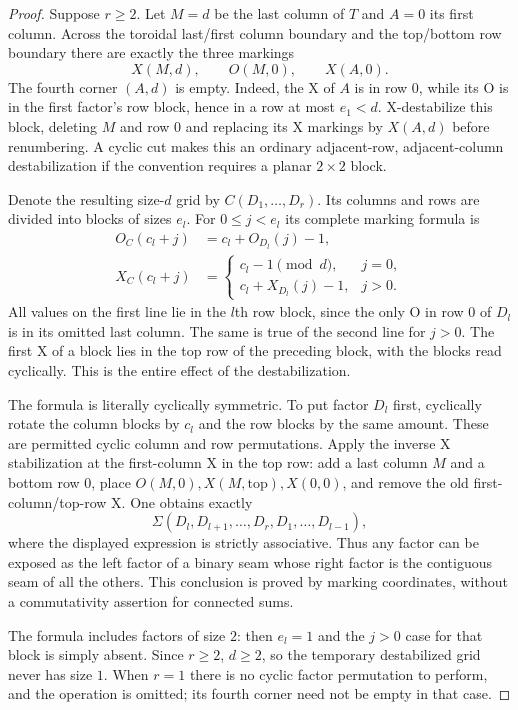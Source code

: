 \documentclass[11pt,a4paper]{article}
\theoremstyle{remark}
\begin{document}
\begin{proof}
Suppose $r\geq2$.  Let $M=d$ be the last column of $T$ and $A=0$ its
first column.  Across the toroidal last/first column boundary and the
top/bottom row boundary there are exactly the three markings
\[
 X(M,d),\qquad O(M,0),\qquad X(A,0).
\]
The fourth corner $(A,d)$ is empty.  Indeed, the X of $A$ is in row
$0$, while its O is in the first factor's row block, hence in a row
at most $e_1<d$.  X-destabilize this block, deleting $M$ and row $0$
and replacing its X markings by $X(A,d)$ before renumbering.  A cyclic
cut makes this an ordinary adjacent-row, adjacent-column
destabilization if the convention requires a planar $2\times2$ block.

Denote the resulting size-$d$ grid by $C(D_1,\ldots,D_r)$.  Its columns
and rows are divided into blocks of sizes $e_l$.  For
$0\leq j<e_l$ its complete marking formula is
\begin{equation}\label{eq:cyclic-block-grid}
\begin{split}
 O_C(c_l+j)&=c_l+O_{D_l}(j)-1,\\
 X_C(c_l+j)&=
 \begin{cases}
 c_l-1\pmod d,&j=0,\\
 c_l+X_{D_l}(j)-1,&j>0.
 \end{cases}
\end{split}
\end{equation}
All values on the first line lie in the $l$th row block, since the only
O in row $0$ of $D_l$ is in its omitted last column.  The same is true
of the second line for $j>0$.  The first X of a block lies in the top
row of the preceding block, with the blocks read cyclically.  This is
the entire effect of the destabilization.

The formula is literally cyclically symmetric.  To put factor $D_l$
first, cyclically rotate the column blocks by $c_l$ and the row blocks
by the same amount.  These are permitted cyclic column and row
permutations.  Apply the inverse X stabilization at the first-column
X in the top row: add a last column $M$ and a bottom row $0$, place
$O(M,0),X(M,\mathrm{top}),X(0,0)$, and remove the old
first-column/top-row X.  One obtains exactly
\[
 \Sigma(D_l,D_{l+1},\ldots,D_r,D_1,\ldots,D_{l-1}),
\]
where the displayed expression is strictly associative.  Thus any
factor can be exposed as the left factor of a binary seam whose right
factor is the contiguous seam of all the others.  This conclusion is
proved by marking coordinates, without a commutativity assertion for
connected sums.

The formula includes factors of size $2$: then $e_l=1$ and the
$j>0$ case for that block is simply absent.  Since $r\geq2$, $d\geq2$,
so the temporary destabilized grid never has size $1$.  When $r=1$
there is no cyclic factor permutation to perform, and the operation is
omitted; its fourth corner need not be empty in that case.


\end{proof}
\end{document}
